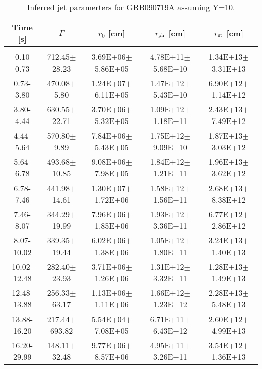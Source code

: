 \begin{table}[htp]
\scriptsize
\label{tab:}
\begin{tabular}{c c c c c}
Time [s] & $\Gamma$ & $r_0$ [cm] & $r_{\rm ph}$ [cm] & $r_{\rm nt}$ [cm] \\
\hline \hline\\ 

-0.10-0.73 & 712.45$\pm$28.23 & 3.69E+06$\pm$5.86E+05 & 4.78E+11$\pm$5.68E+10 & 1.34E+13$\pm$3.31E+13 \\ 

0.73-3.80 & 470.08$\pm$5.80 & 1.24E+07$\pm$6.11E+05 & 1.47E+12$\pm$5.43E+10 & 6.90E+12$\pm$1.14E+12 \\ 

3.80-4.44 & 630.55$\pm$22.71 & 3.70E+06$\pm$5.32E+05 & 1.09E+12$\pm$1.18E+11 & 2.43E+13$\pm$7.49E+12 \\ 

4.44-5.64 & 570.80$\pm$9.89 & 7.84E+06$\pm$5.43E+05 & 1.75E+12$\pm$9.09E+10 & 1.87E+13$\pm$3.03E+12 \\ 

5.64-6.78 & 493.68$\pm$10.85 & 9.08E+06$\pm$7.98E+05 & 1.84E+12$\pm$1.21E+11 & 1.96E+13$\pm$3.62E+12 \\ 

6.78-7.46 & 441.98$\pm$14.61 & 1.30E+07$\pm$1.72E+06 & 1.58E+12$\pm$1.56E+11 & 2.68E+13$\pm$8.38E+12 \\ 

7.46-8.07 & 344.29$\pm$19.99 & 7.96E+06$\pm$1.85E+06 & 1.93E+12$\pm$3.36E+11 & 6.77E+12$\pm$2.86E+12 \\ 

8.07-10.02 & 339.35$\pm$19.44 & 6.02E+06$\pm$1.38E+06 & 1.05E+12$\pm$1.80E+11 & 3.24E+13$\pm$1.40E+13 \\ 

10.02-12.48 & 282.40$\pm$23.93 & 3.71E+06$\pm$1.26E+06 & 1.31E+12$\pm$3.32E+11 & 1.28E+13$\pm$1.49E+13 \\ 

12.48-13.88 & 256.33$\pm$63.17 & 1.13E+06$\pm$1.11E+06 & 1.66E+12$\pm$1.23E+12 & 2.28E+13$\pm$5.48E+13 \\ 

13.88-16.20 & 217.44$\pm$693.82 & 5.54E+04$\pm$7.08E+05 & 6.71E+11$\pm$6.43E+12 & 2.60E+12$\pm$4.99E+13 \\ 

16.20-29.99 & 148.11$\pm$32.48 & 9.77E+06$\pm$8.57E+06 & 4.95E+11$\pm$3.26E+11 & 3.54E+12$\pm$1.36E+13 \\ 

\end{tabular}
\caption{Inferred jet paramerters for GRB090719A assuming Y=10.}
\end{table}
